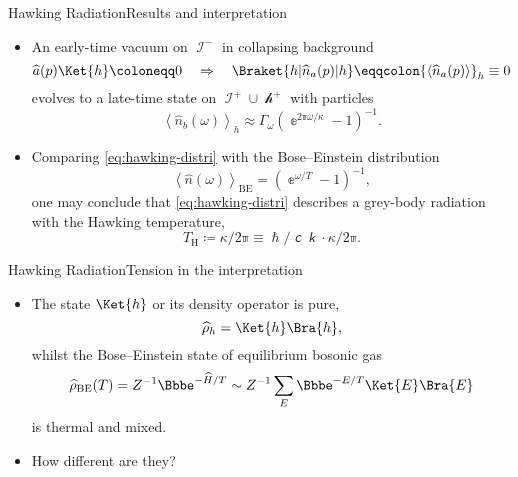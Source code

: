 \documentclass{beamer}
\newcommand{\ee}{{\Bbbe}}
\newcommand{\pp}{{\Bbbpi}}
\newcommand{\lc}{\mitsansc} %
\newcommand{\bk}{\mitsansk} %
\newcommand{\phs}{\hslash} %
\newcommand{\rbr}[1]{{\left(#1\right)}}
\newcommand{\abr}[1]{{\left<#1\right>}}
\newcommand{\rfun}[2]{{#1}\mathopen{}\left(#2\right)\mathclose{}}
\newcommand{\what}[1]{{\widehat{#1}}}
\begin{document}
\begin{frame}{Hawking Radiation}{Results and interpretation 
\cite{HAWKING1974,Hawking1975}}

\begin{itemize}
\item An early-time \alert{vacuum} on $\mscrI^-$ in collapsing background
\begin{equation}
\rfun{\what{a}}{p}\Ket{h} \coloneqq 0\quad\Rightarrow\quad
\Braket{h | \rfun{\what{n}_a}{p} | h} \eqqcolon \abr{\rfun{\what{n}_a}{p}}_h 
\equiv 0
\end{equation}
evolves to a late-time state on $\mscrI^+\cup\mscrh^+$ \alert{with particles}
\begin{equation}
\abr{\rfun{\what{n}_b}{\omega}}_h \approx
\Gamma_\omega\rbr{\ee^{2\pp\omega/\kappa}-1}^{-1}.
\label{eq:hawking-distri}
\end{equation}
\item Comparing \cref{eq:hawking-distri} with the Bose--Einstein distribution
\begin{equation}
\abr{\rfun{\what{n}}{\omega}}_\text{BE} = \rbr{\ee^{\omega/T} - 1}^{-1}, 
\end{equation}
one may conclude that \cref{eq:hawking-distri} describes a grey-body
radiation with the \alert{Hawking temperature},
\begin{equation}
T_\text{H} \coloneqq \kappa/2\pp \equiv \phs/\lc\bk \cdot \kappa/2\pp.
\end{equation}

\end{itemize}

\end{frame}


\begin{frame}{Hawking Radiation}{Tension in the interpretation}
\begin{itemize}
\item The state $\Ket{h}$ or its density operator is \alert{pure},
\begin{equation}
\what{\rho}_h = \Ket{h}\Bra{h},
\end{equation}
whilst the Bose--Einstein state of equilibrium bosonic gas
\begin{equation}
\rfun{\what{\rho}_\text{BE}}{T} = {Z}^{-1} \ee^{-\what{H}/T}
\sim Z^{-1} \sum_E \ee^{-E/T} \Ket{E}\Bra{E}
\end{equation}
is \alert{thermal} and \alert{mixed}.
\item How different are they? \cite{Kiefer2001,Hsu2009}
\end{itemize}
\end{frame}
\end{document}
